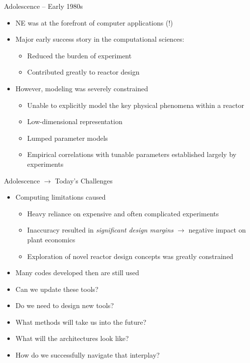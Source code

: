 \documentclass[xcolor=x11names,compress]{beamer}
\renewcommand{\(}{\begin{columns}}
\renewcommand{\)}{\end{columns}}
\newcommand{\<}[1]{\begin{column}{#1}}
\renewcommand{\>}{\end{column}}
\begin{document}
\begin{frame}{Adolescence -- Early 1980s}
\begin{itemize}
\item NE was at the forefront of computer applications (!)
\item Major early success story in the computational sciences:
\begin{itemize}
\item Reduced the burden of experiment
\item Contributed greatly to reactor design
\end{itemize}
\item However, modeling was severely constrained 
\begin{itemize}
\item Unable to explicitly model the key physical phenomena within a reactor
\item Low-dimensional representation
\item Lumped parameter models
\item Empirical correlations with tunable parameters established largely by experiments
\end{itemize}
\end{itemize}
\end{frame}

\begin{frame}{Adolescence $\rightarrow$ Today's Challenges}
\begin{itemize}
\item Computing limitations caused
\begin{itemize}
\item Heavy reliance on expensive and often complicated experiments
\item Inaccuracy resulted in \emph{significant design margins} $\rightarrow$ negative impact on plant economics
\item Exploration of novel reactor design concepts was greatly constrained 
\vspace*{1 em}
\end{itemize}
\item Many codes developed then are still used 
\pause
\item Can we update these tools?
\pause
\item Do we need to design new tools?
\pause
\item What methods will take us into the future?
\pause
\item What will the architectures look like?
\pause
\item How do we successfully navigate that interplay?
\end{itemize}
\end{frame}
\end{document}
